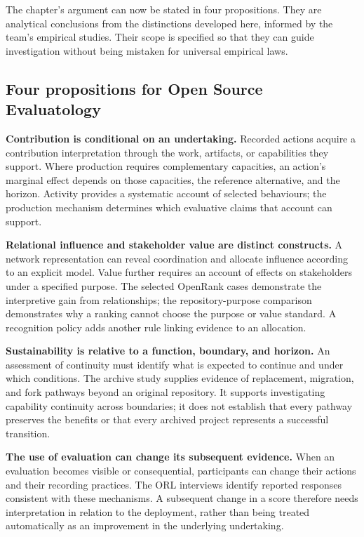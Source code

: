 The chapter's argument can now be stated in four propositions. They are analytical conclusions from the distinctions developed here, informed by the team's empirical studies. Their scope is specified so that they can guide investigation without being mistaken for universal empirical laws.

\subsection{Four propositions for Open Source Evaluatology}
\noindent\textbf{Contribution is conditional on an undertaking.}
Recorded actions acquire a contribution interpretation through the work, artifacts, or capabilities they support. Where production requires complementary capacities, an action's marginal effect depends on those capacities, the reference alternative, and the horizon. Activity provides a systematic account of selected behaviours; the production mechanism determines which evaluative claims that account can support.

\noindent\textbf{Relational influence and stakeholder value are distinct constructs.}
A network representation can reveal coordination and allocate influence according to an explicit model. Value further requires an account of effects on stakeholders under a specified purpose. The selected OpenRank cases demonstrate the interpretive gain from relationships; the repository-purpose comparison demonstrates why a ranking cannot choose the purpose or value standard. A recognition policy adds another rule linking evidence to an allocation.

\noindent\textbf{Sustainability is relative to a function, boundary, and horizon.}
An assessment of continuity must identify what is expected to continue and under which conditions. The archive study supplies evidence of replacement, migration, and fork pathways beyond an original repository. It supports investigating capability continuity across boundaries; it does not establish that every pathway preserves the benefits or that every archived project represents a successful transition.

\noindent\textbf{The use of evaluation can change its subsequent evidence.}
When an evaluation becomes visible or consequential, participants can change their actions and their recording practices. The ORL interviews identify reported responses consistent with these mechanisms. A subsequent change in a score therefore needs interpretation in relation to the deployment, rather than being treated automatically as an improvement in the underlying undertaking.

